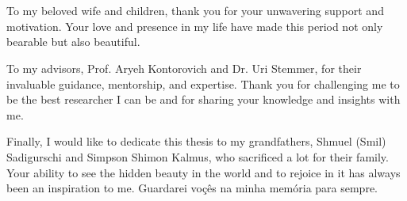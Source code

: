 \chapter*{ }
  \begin{dedication}
    To my beloved wife and children, thank you for your unwavering support and motivation. Your love and presence in my life have made this period not only bearable but also beautiful.
    
    \par   %
    \vspace{2\baselineskip}
 
    To my advisors, Prof. Aryeh Kontorovich and Dr. Uri Stemmer, for their invaluable guidance, mentorship, and expertise. Thank you for challenging me to be the best researcher I can be and for sharing your knowledge and insights with me.

    \par   %
    \vspace{2\baselineskip}
    
    Finally, I would like to dedicate this thesis to my grandfathers, Shmuel (Smil) Sadigurschi and Simpson Shimon Kalmus, 
    who sacrificed a lot for their family. 
    Your ability to see the hidden beauty in the world and to rejoice in it has always been an inspiration to me. 
    Guardarei voçês na minha memória para sempre.
    
\end{dedication}